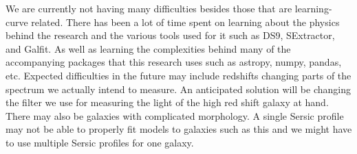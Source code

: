 \documentclass{article}
\begin{document}
We are currently not having many difficulties besides those that are learning-curve related. There has been a lot of time spent on learning about the physics behind the research and the various tools used for it such as DS9, SExtractor, and Galfit. As well as learning the complexities behind many of the accompanying packages that this research uses such as astropy, numpy, pandas, etc. Expected difficulties in the future may include redshifts changing parts of the spectrum we actually intend to measure. An anticipated solution will be changing the filter we use for measuring the light of the high red shift galaxy at hand. There may also be galaxies with complicated morphology. A single Sersic profile may not be able to properly fit models to galaxies such as this and we might have to use multiple Sersic profiles for one galaxy.


\end{document}
